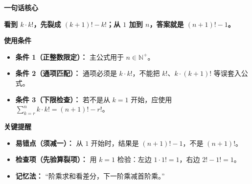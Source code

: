 \begin{summarybox}
\textbf{\textcolor{CSummary}{一句话核心}}

\textbf{看到 $k\cdot k!$，先裂成 $(k+1)!-k!$；从 $1$ 加到 $n$，答案就是 $(n+1)!-1$。}

\medskip
\textbf{\textcolor{CSummary}{使用条件}}
\begin{itemize}[leftmargin=*, itemsep=0.5em, topsep=0.4em]
    \item \textbf{条件 1（正整数限定）：} 主公式用于 $n\in\mathbb{N}^+$。
    \item \textbf{条件 2（通项匹配）：} 通项必须是 $k\cdot k!$，不能把 $k!$、$k\cdot(k+1)!$ 等误套入公式。
    \item \textbf{条件 3（下限检查）：} 若不是从 $k=1$ 开始，应使用 $\sum_{k=r}^{n}k\cdot k!=(n+1)!-r!$。
\end{itemize}

\medskip
\textbf{\textcolor{CSummary}{关键提醒}}
\begin{itemize}[leftmargin=*, itemsep=0.5em, topsep=0.4em]
    \item \textbf{易错点（须减一）：} 从 $1$ 开始时，结果是 $(n+1)!-1$，不是 $(n+1)!$。
    \item \textbf{检查项（先验算裂项）：} 用 $k=1$ 检验：左边 $1\cdot1!=1$，右边 $2!-1!=1$。
    \item \textbf{记忆法：} “阶乘求和看差分，下一阶乘减首阶乘。”
\end{itemize}
\end{summarybox}
